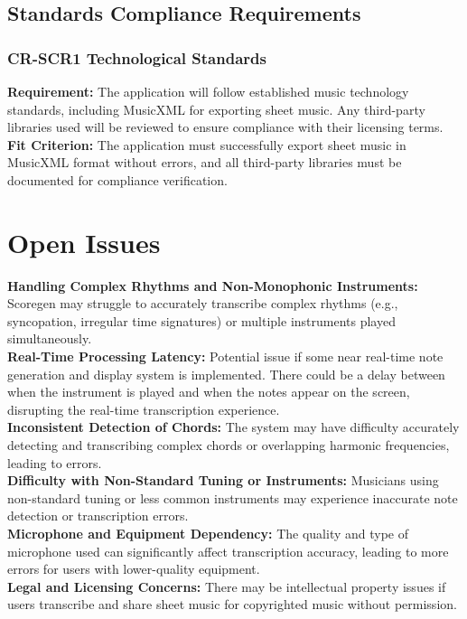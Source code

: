 \documentclass[12pt]{article}
\begin{document}
\subsection{Standards Compliance Requirements}

\subsubsection*{CR-SCR1 Technological Standards}
\textbf{Requirement: }The application will follow established music technology standards, including MusicXML for exporting sheet music. Any third-party libraries used will be reviewed to ensure compliance with their licensing terms.
\textbf{Fit Criterion:} The application must successfully export sheet music in MusicXML format without errors, and all third-party libraries must be documented for compliance verification.



\section{Open Issues}

\textbf{Handling Complex Rhythms and Non-Monophonic Instruments:} Scoregen may struggle to accurately transcribe complex rhythms (e.g., syncopation, irregular time signatures) or multiple instruments played simultaneously. \\
\textbf{Real-Time Processing Latency:  }Potential issue if some near real-time note generation and display system is implemented. There could be a delay between when the instrument is played and when the notes appear on the screen, disrupting the real-time transcription experience. \\
\textbf{Inconsistent Detection of Chords:}  The system may have difficulty accurately detecting and transcribing complex chords or overlapping harmonic frequencies, leading to errors. \\
\textbf{Difficulty with Non-Standard Tuning or Instruments:} Musicians using non-standard tuning or less common instruments may experience inaccurate note detection or transcription errors. \\
\textbf{Microphone and Equipment Dependency:} The quality and type of microphone used can significantly affect transcription accuracy, leading to more errors for users with lower-quality equipment. \\
\textbf{Legal and Licensing Concerns:} There may be intellectual property issues if users transcribe and share sheet music for copyrighted music without permission.
\end{document}
